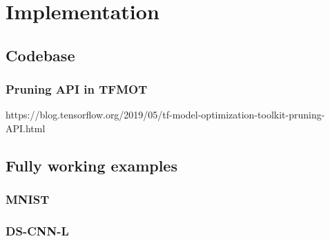 \chapter{Implementation}\label{ch:implementation}
\lipsum[1]

\section{Codebase}
\lipsum[1]

\subsection{Pruning API in TFMOT}
https://blog.tensorflow.org/2019/05/tf-model-optimization-toolkit-pruning-API.html
\lipsum[1]

\section{Fully working examples}
\lipsum[1]

\subsection{MNIST}
\lipsum[1]

\subsection{DS-CNN-L}
\lipsum[1]
